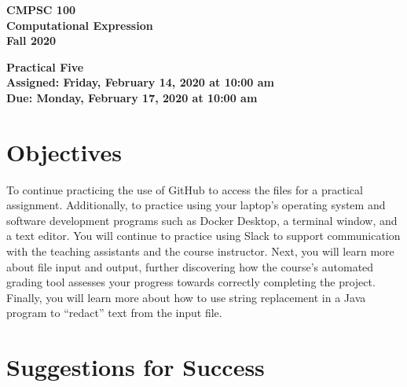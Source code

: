\documentclass[11pt]{article}
\newcommand{\assignmentduedate}{February 17}
\newcommand{\assignmentassignedate}{February 14}
\newcommand{\assignmentnumber}{Five}
\newcommand{\labyear}{2020}
\newcommand{\labdueday}{Monday}
\newcommand{\labassignday}{Friday}
\newcommand{\labtime}{10:00 am}
\newcommand{\assigneddate}{Assigned: \labassignday, \assignmentassignedate, \labyear{} at \labtime{}}
\newcommand{\duedate}{Due: \labdueday, \assignmentduedate, \labyear{} at \labtime{}}
\newcommand{\labtitle}[1]
{
  \begin{center}
    \begin{center}
      \bf
      CMPSC 100\\Computational Expression\\
      Fall 2020\\
      \medskip
    \end{center}
    \bf
    #1
  \end{center}
}
\begin{document}
\thispagestyle{empty}

\labtitle{Practical \assignmentnumber{} \\ \assigneddate{} \\ \duedate{}}

\section*{Objectives}

To continue practicing the use of GitHub to access the files for a practical
assignment. Additionally, to practice using your laptop's operating system and
software development programs such as Docker Desktop, a terminal window, and a
text editor. You will continue to practice using Slack to support communication
with the teaching assistants and the course instructor. Next, you will learn
more about file input and output, further discovering how the course's automated
grading tool assesses your progress towards correctly completing the project.
Finally, you will learn more about how to use string replacement in a Java
program to ``redact'' text from the input file.

\section*{Suggestions for Success}
\end{document}
